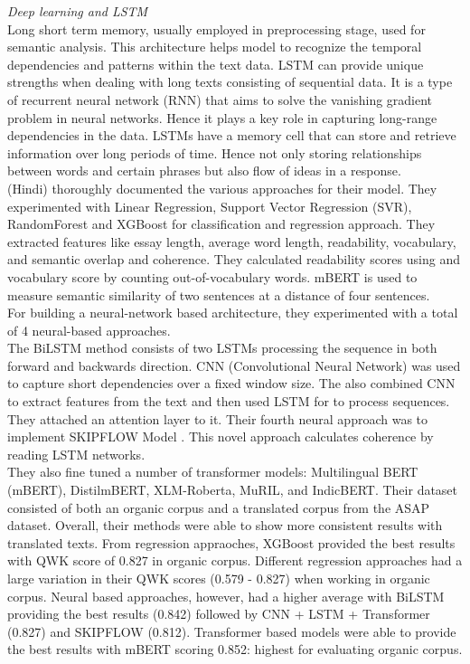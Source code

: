 \documentclass{article}
\begin{document}
	
	\textit{Deep learning and LSTM} \\
	Long short term memory, usually employed in preprocessing stage, used for semantic analysis. This architecture helps model to recognize the temporal dependencies and patterns within the text data. LSTM can provide unique strengths when dealing with long texts consisting of sequential data. It is a type of recurrent neural network (RNN) that aims to solve the vanishing gradient problem in neural networks. Hence it plays a key role in capturing long-range dependencies in the data. LSTMs have a memory cell that can store and retrieve information over long periods of time. Hence not only storing relationships between words and certain phrases but also flow of ideas in a response. \\
	
	\textbf{\textcite{10_singh2023hindi}} (Hindi) thoroughly documented the various approaches for their model. They experimented with Linear Regression, Support Vector Regression (SVR), RandomForest and XGBoost for classification and regression approach. They extracted features like essay length, average word length, readability, vocabulary, and semantic overlap and coherence. They calculated readability scores using \cite{sinha2012new} and vocabulary score by counting out-of-vocabulary words. mBERT is used to measure semantic similarity of two sentences at a distance of four sentences. \\ For building a neural-network based architecture,  they experimented with a total of 4 neural-based approaches. \\ The BiLSTM method consists of two LSTMs processing the sequence in both forward and backwards direction. CNN (Convolutional Neural Network) was used to capture short dependencies over a fixed window size. The also combined CNN to extract features from the text and then used LSTM for to process sequences. They attached an attention layer to it. Their fourth neural approach was to implement SKIPFLOW Model \cite{tay2018skipflow}. This novel approach calculates coherence by reading LSTM networks. \\ They also fine tuned a number of transformer models: Multilingual BERT (mBERT), DistilmBERT, XLM-Roberta, MuRIL, and IndicBERT. Their dataset consisted of both an organic corpus and a translated corpus from the ASAP dataset. Overall, their methods were able to show more consistent results with translated texts. From regression appraoches, XGBoost provided the best results with QWK score of 0.827 in organic corpus. Different regression approaches had a large variation in their QWK scores (0.579 - 0.827) when working in organic corpus. Neural based approaches, however, had a higher average with BiLSTM providing the best results (0.842) followed by CNN + LSTM + Transformer (0.827) and SKIPFLOW (0.812). Transformer based models were able to provide the best results with mBERT scoring 0.852: highest for evaluating organic corpus. \\
	
\end{document}
